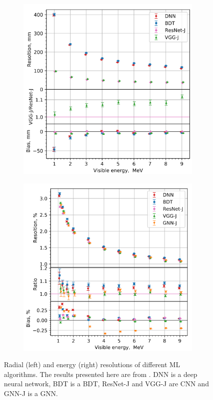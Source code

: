 \documentclass[../main.tex]{subfiles}
\begin{document}
\begin{figure}[ht]
  \centering
  \begin{subfigure}{0.48\linewidth}
    \centering
    \includegraphics[width=\linewidth]{images/juno/reco/ml_vertex.png}
  \end{subfigure}
  \hfill
  \begin{subfigure}{0.48\linewidth}
    \centering
    \includegraphics[width=\linewidth]{images/juno/reco/ml_energy.png}
  \end{subfigure}
  \caption{Radial (left) and energy (right) resolutions of different ML algorithms. The results presented here are from \cite{qian_vertex_2021}. DNN is a deep neural network, BDT is a BDT, ResNet-J and VGG-J are CNN and GNN-J is a GNN.}
  \label{fig:juno:rec:ml_res}
\end{figure}
\end{document}
